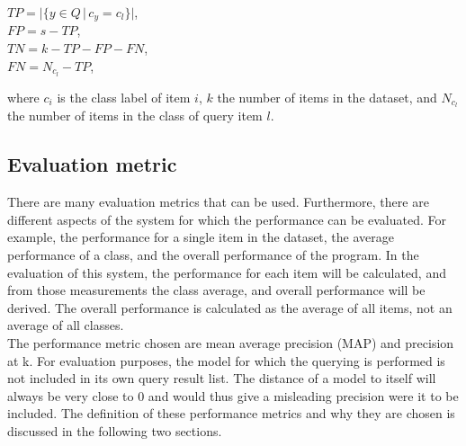 \documentclass{bigdata}
\begin{document}
\begin{center}
	$TP = |\{y \in Q\, |\, c_y = c_l\}|$,\\
	$FP = s - TP$,\\
	$TN = k - TP - FP - FN$,\\
	$FN = N_{c_l} - TP$,\\
\end{center}

\noindent where $c_i$ is the class label of item $i$, $k$ the number of items in the dataset, and $N_{c_l}$ the number of items in the class of query item $l$.  

\subsection{Evaluation metric}
There are many evaluation metrics that can be used. Furthermore, there are different aspects of the system for which the performance can be evaluated. For example, the performance for a single item in the dataset, the average performance of a class, and the overall performance of the program. In the evaluation of this system, the performance for each item will be calculated, and from those measurements the class average, and overall performance will be derived. The overall performance is calculated as the average of all items, not an average of all classes.\\
The performance metric chosen are mean average precision (MAP) and precision at k. For evaluation purposes, the model for which the querying is performed is not included in its own query result list. The distance of a model to itself will always be very close to 0 and would thus give a misleading precision were it to be included. The definition of these performance metrics and why they are chosen is discussed in the following two sections.
\end{document}
